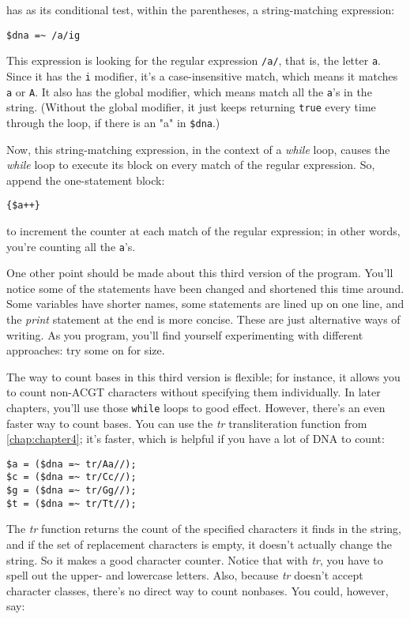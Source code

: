 has as its conditional test, within the parentheses, a string-matching expression:

\begin{lstlisting}
$dna =~ /a/ig 
\end{lstlisting}

This expression is looking for the regular expression \verb|/a/|, that is, the letter \verb|a|. Since it has the \verb|i| modifier, it's a case-insensitive match, which means it matches \verb|a| or \verb|A|. It also has the global modifier, which means match all the \verb|a|'s in the string. (Without the global modifier, it just keeps returning \verb|true| every time through the loop, if there is an "a" in \verb|$dna|.)

Now, this string-matching expression, in the context of a \textit{while} loop, causes the \textit{while} loop to execute its block on every match of the regular expression. So, append the one-statement block:

\begin{lstlisting}
{$a++}
\end{lstlisting}

to increment the counter at each match of the regular expression; in other words, you're counting all the \verb|a|'s. 

One other point should be made about this third version of the program. You'll notice some of the statements have been changed and shortened this time around. Some variables have shorter names, some statements are lined up on one line, and the \textit{print} statement at the end is more concise. These are just alternative ways of writing. As you program, you'll find yourself experimenting with different approaches: try some on for size.

The way to count bases in this third version is flexible; for instance, it allows you to count non-ACGT characters without specifying them individually. In later chapters, you'll use those \verb|while| loops to good effect. However, there's an even faster way to count bases. You can use the \textit{tr} transliteration function from \autoref{chap:chapter4}; it's faster, which is helpful if you have a lot of DNA to count: 

\begin{lstlisting}
$a = ($dna =~ tr/Aa//);
$c = ($dna =~ tr/Cc//);
$g = ($dna =~ tr/Gg//);
$t = ($dna =~ tr/Tt//);
\end{lstlisting}

The \textit{tr} function returns the count of the specified characters it finds in the string, and if the set of replacement characters is empty, it doesn't actually change the string. So it makes a good character counter. Notice that with \textit{tr}, you have to spell out the upper- and lowercase letters. Also, because \textit{tr} doesn't accept character classes, there's no direct way to count nonbases. You could, however, say: 

